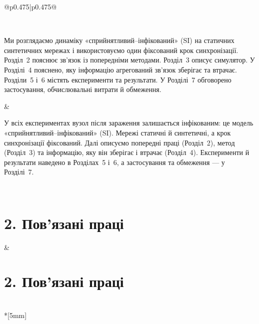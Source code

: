 \documentclass[11pt]{article}
\begin{document}
\begin{longtable}{@{}p{0.475\textwidth}|p{0.475\textwidth}@{}}
\begin{minipage}[t]{\linewidth}
\begin{enumerate}
\end{enumerate}
\end{minipage} \\[5mm]
\begin{minipage}[t]{\linewidth}
Ми розглядаємо динаміку «сприйнятливий--інфікований» (SI) на статичних синтетичних мережах і використовуємо один фіксований крок синхронізації. Розділ~2 пояснює зв'язок із попередніми методами. Розділ~3 описує симулятор. У Розділі~4 пояснено, яку інформацію агрегований зв'язок зберігає та втрачає. Розділи~5 і~6 містять експерименти та результати. У Розділі~7 обговорено застосування, обчислювальні витрати й обмеження.
\end{minipage} &
\begin{minipage}[t]{\linewidth}
У всіх експериментах вузол після зараження залишається інфікованим: це модель «сприйнятливий--інфікований» (SI). Мережі статичні й синтетичні, а крок синхронізації фіксований. Далі описуємо попередні праці (Розділ~2), метод (Розділ~3) та інформацію, яку він зберігає і втрачає (Розділ~4). Експерименти й результати наведено в Розділах~5 і~6, а застосування та обмеження --- у Розділі~7.
\end{minipage} \\[5mm]
\begin{minipage}[t]{\linewidth}
\section*{2. Пов'язані праці}

\end{minipage} &
\begin{minipage}[t]{\linewidth}
\section*{2. Пов'язані праці}

\end{minipage} \\*[5mm]
\begin{minipage}[t]{\linewidth}

\end{minipage}
\end{longtable}
\end{document}
